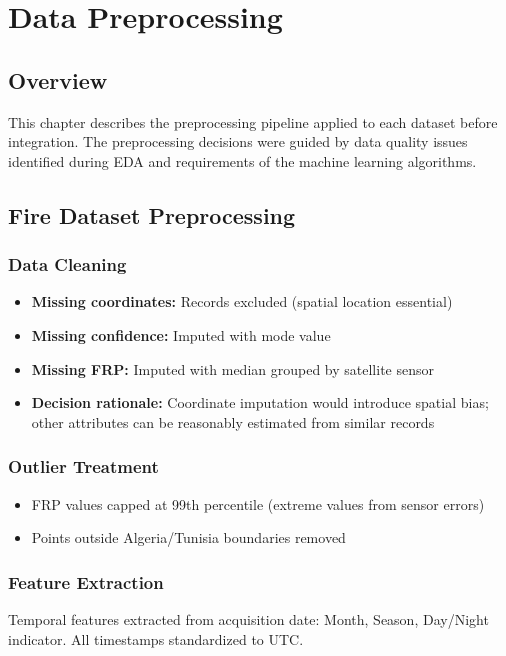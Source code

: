 \chapter{Data Preprocessing}

\section{Overview}
This chapter describes the preprocessing pipeline applied to each dataset before integration. The preprocessing decisions were guided by data quality issues identified during EDA and requirements of the machine learning algorithms.

\section{Fire Dataset Preprocessing}

\subsection*{Data Cleaning}
\begin{itemize}
    \item \textbf{Missing coordinates:} Records excluded (spatial location essential)
    \item \textbf{Missing confidence:} Imputed with mode value
    \item \textbf{Missing FRP:} Imputed with median grouped by satellite sensor
    \item \textbf{Decision rationale:} Coordinate imputation would introduce spatial bias; other attributes can be reasonably estimated from similar records
\end{itemize}

\subsection*{Outlier Treatment}
\begin{itemize}
    \item FRP values capped at 99th percentile (extreme values from sensor errors)
    \item Points outside Algeria/Tunisia boundaries removed
\end{itemize}

\subsection*{Feature Extraction}
Temporal features extracted from acquisition date: Month, Season, Day/Night indicator. All timestamps standardized to UTC.

